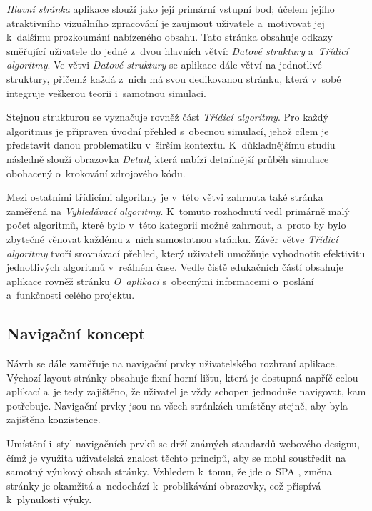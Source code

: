 \textit{Hlavní stránka} aplikace slouží jako její primární vstupní bod; účelem jejího atraktivního vizuálního zpracování je zaujmout uživatele a~motivovat jej k~dalšímu prozkoumání nabízeného obsahu.
Tato stránka obsahuje odkazy směřující uživatele do jedné z~dvou hlavních větví: \textit{Datové struktury} a~\textit{Třídicí algoritmy}.
Ve větvi \textit{Datové struktury} se aplikace dále větví na jednotlivé struktury, přičemž každá z~nich má svou dedikovanou stránku, která v~sobě integruje veškerou teorii i~samotnou simulaci.

Stejnou strukturou se vyznačuje rovněž část \textit{Třídicí algoritmy}.
Pro každý algoritmus je připraven úvodní přehled s~obecnou simulací, jehož cílem je představit danou problematiku v~širším kontextu.
K~důkladnějšímu studiu následně slouží obrazovka \textit{Detail}, která nabízí detailnější průběh simulace obohacený o~krokování zdrojového kódu.

Mezi ostatními třídicími algoritmy je v~této větvi zahrnuta také stránka zaměřená na \textit{Vyhledávací algoritmy}.
K~tomuto rozhodnutí vedl primárně malý počet algoritmů, které bylo v~této kategorii možné zahrnout, a~proto by bylo zbytečné věnovat každému z~nich samostatnou stránku.
Závěr větve \textit{Třídicí algoritmy} tvoří srovnávací přehled, který uživateli umožňuje vyhodnotit efektivitu jednotlivých algoritmů v~reálném čase.
Vedle čistě edukačních částí obsahuje aplikace rovněž stránku \textit{O~aplikaci} s~obecnými informacemi o~poslání a~funkčnosti celého projektu.

\subsection{Navigační koncept}
\label{subsec:navigation-concept}

Návrh se dále zaměřuje na navigační prvky uživatelského rozhraní aplikace.
Výchozí layout stránky obsahuje fixní horní lištu, která je dostupná napříč celou aplikací a~je tedy zajištěno, že uživatel je vždy schopen jednoduše navigovat, kam potřebuje.
Navigační prvky jsou na všech stránkách umístěny stejně, aby byla zajištěna konzistence.

Umístění i~styl navigačních prvků se drží známých standardů webového designu, čímž je využita uživatelská znalost těchto principů, aby se mohl soustředit na samotný výukový obsah stránky.
Vzhledem k~tomu, že jde o~SPA , změna stránky je okamžitá a~nedochází k~problikávání obrazovky, což přispívá k~plynulosti výuky.

